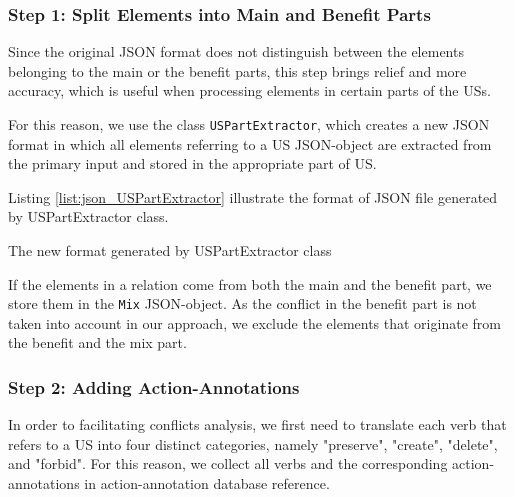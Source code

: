 \subsubsection*{Step 1: Split Elements into Main and Benefit Parts}\label{conflict_design_step_1}
Since the original JSON format does not distinguish between the elements belonging to the main or the benefit parts, this step brings relief and more accuracy, which is useful when processing elements in certain parts of the USs.

For this reason, we use the class \texttt{USPartExtractor}, which creates a new JSON format in which all elements referring to a US JSON-object are extracted from the primary input and stored in the appropriate part of US.

Listing \ref{list:json_USPartExtractor} illustrate the format of JSON file generated by USPartExtractor class.

\begin{MyListing}
	\centering
	
	\caption{The new format generated by USPartExtractor class}\label{list:json_USPartExtractor}
\end{MyListing}
If the elements in a relation come from both the main and the benefit part, we store them in the \texttt{Mix} JSON-object. As the conflict in the benefit part is not taken into account in our approach, we exclude the elements that originate from the benefit and the mix part.
\subsubsection*{Step 2: Adding Action-Annotations}
In order to facilitating conflicts analysis, we first need to translate each verb that refers to a US into four distinct categories, namely "preserve", "create", "delete", and "forbid". For this reason, we collect all verbs and the corresponding action-annotations in action-annotation database reference.

